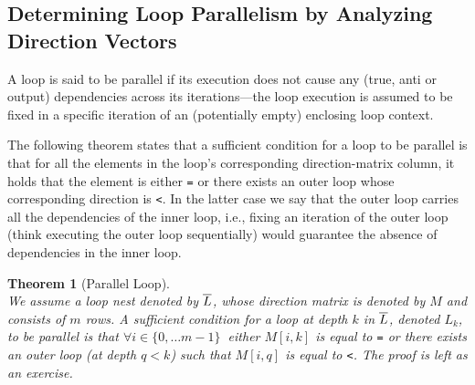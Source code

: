 \documentclass[acmsmall,review]{acmart}\settopmatter{printfolios=true,printccs=false,printacmref=false}
\newtheorem{mytheo}{Theorem}
\begin{document}
\subsection{Determining Loop Parallelism by Analyzing Direction Vectors}
\label{subsec:loop-par}

A loop is said to be parallel if its execution does not
cause any (true, anti or output) dependencies across
its iterations---the loop execution is assumed to be fixed
in a specific iteration of an (potentially empty) enclosing
loop context.

The following theorem states that a sufficient condition for
a loop to be parallel is that for all the elements in
the loop's corresponding direction-matrix column, it holds
that the element is either {\tt=} or there exists an
outer loop whose corresponding direction is {\tt<}.
In the latter case we say that the outer loop carries
all the dependencies of the inner loop, i.e., fixing
an iteration of the outer loop (think executing the outer
loop sequentially) would guarantee the absence of dependencies 
in the inner loop.  

\begin{mytheo}[Parallel Loop]\label{Loop-Par}
$\mbox{ }$\\
We assume a loop nest denoted by $\overline{L}$, whose direction
matrix is denoted by $M$ and consists of $m$ rows.
{\em A sufficient condition} for a loop at depth $k$ in $\overline{L}$,
denoted $L_k$, to be parallel is that
$\forall i\in\{0,\ldots m-1\}~$ either $M[i,k]$ is equal
to {\tt=} or there exists an outer loop (at depth $q<k$)
such that $M[i,q]$ is equal to {\tt<}.
\emph{The proof} is left as an exercise.
\end{mytheo}
\end{document}
